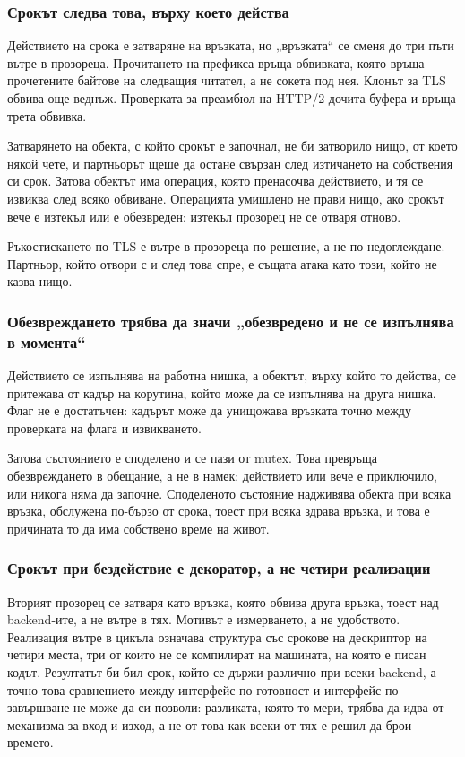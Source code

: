 \subsubsection{Срокът следва това, върху което действа}

Действието на срока е затваряне на връзката, но „връзката“ се сменя до три пъти вътре в
прозореца. Прочитането на префикса връща обвивката, която връща прочетените байтове на
следващия читател, а не сокета под нея. Клонът за TLS обвива още веднъж. Проверката за
преамбюл на HTTP/2 дочита буфера и връща трета обвивка.

Затварянето на обекта, с който срокът е започнал, не би затворило нищо, от което някой
чете, и партньорът щеше да остане свързан след изтичането на собствения си срок. Затова
обектът има операция, която пренасочва действието, и тя се извиква след всяко обвиване.
Операцията умишлено не прави нищо, ако срокът вече е изтекъл или е обезвреден: изтекъл
прозорец не се отваря отново.

Ръкостискането по TLS е вътре в прозореца по решение, а не по недоглеждане. Партньор, който
отвори с  и след това спре, е същата атака като този, който не казва нищо.

\subsubsection{Обезвреждането трябва да значи „обезвредено и не се изпълнява в момента“}

Действието се изпълнява на работна нишка, а обектът, върху който то действа, се притежава
от кадър на корутина, който може да се изпълнява на друга нишка. Флаг не е достатъчен:
кадърът може да унищожава връзката точно между проверката на флага и извикването.

Затова състоянието е споделено и се пази от mutex. Това превръща обезвреждането в обещание,
а не в намек: действието или вече е приключило, или никога няма да започне. Споделеното
състояние надживява обекта при всяка връзка, обслужена по-бързо от срока, тоест при всяка
здрава връзка, и това е причината то да има собствено време на живот.

\subsubsection{Срокът при бездействие е декоратор, а не четири реализации}

Вторият прозорец се затваря като връзка, която обвива друга връзка, тоест над backend-ите,
а не вътре в тях. Мотивът е измерването, а не удобството. Реализация вътре в цикъла
означава структура със срокове на дескриптор на четири места, три от които не се компилират на машината, на която
е писан кодът. Резултатът би бил срок, който се държи различно при всеки backend, а точно
това сравнението между интерфейс по готовност и интерфейс по завършване не може да си
позволи: разликата, която то мери, трябва да идва от механизма за вход и изход, а не от
това как всеки от тях е решил да брои времето.

